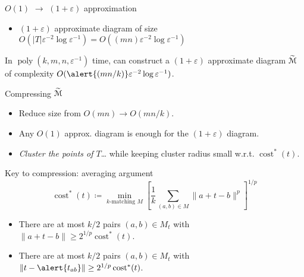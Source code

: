 \documentclass[xcolor={dvipsnames,usenames},handout]{beamer} %
\newcommand{\eps}{\varepsilon}
\DeclareMathOperator{\poly}{poly}
\def\abs#1{\mathopen| #1 \mathclose|}		%
\def\norm#1{\mathopen\| #1 \mathclose\|}	%
\DeclareMathOperator{\cost}{cost}
\newcommand{\tildeM}{\widetilde{\EuScript{M}}}
\def\EMPH#1{\textcolor{BrickRed}{{\emph{#1}}}}
\begin{document}
\begin{frame}{$O(1)$ $\rightarrow$ $(1+\eps)$ approximation}
\begin{itemize}
\item $(1+\eps)$ approximate diagram of size
	$O(\abs{T}\eps^{-2}\log\eps^{-1}) = O((mn)\eps^{-2}\log\eps^{-1})$
\end{itemize}
\begin{theorem}
In $\poly(k, m, n, \eps^{-1})$ time, can construct a $(1+\eps)$ approximate
diagram $\tildeM$ of complexity $O(\alert{(mn/k)}\eps^{-2}\log\eps^{-1})$.
\end{theorem}
\end{frame}

\begin{frame}{Compressing $\tildeM$}
\begin{itemize}
\item Reduce size from $O(mn) \rightarrow O(mn/k)$.
\item Any $O(1)$ approx. diagram is enough for the $(1+\eps)$ diagram.
\item \EMPH{Cluster the points of $T$}\ldots
	while keeping cluster radius small w.r.t. $\cost^*(t)$.
\end{itemize}
\end{frame}

\begin{frame}{Key to compression: averaging argument}
\begin{equation*}
\cost^*(t) \coloneqq \min_{\text{$k$-matching $M$}} \left[\frac{1}{k}\sum_{(a, b) \in M}\norm{a+t-b}^p\right]^{1/p}
\end{equation*}
\begin{itemize}
\item There are at most $k/2$ pairs $(a, b) \in M_t$ with $\norm{a+t-b} \geq 2^{1/p}\cost^*(t)$.
\item There are at most $k/2$ pairs $(a, b) \in M_t$ with $\norm{t-\alert{t_{ab}}} \geq 2^{1/p}\cost^*(t)$.
\end{itemize}
\end{frame}
\end{document}
